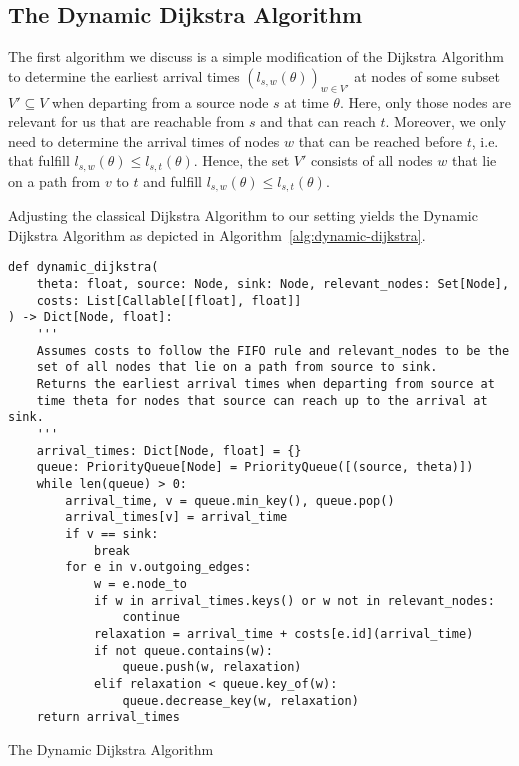\subsection{The Dynamic Dijkstra Algorithm}

The first algorithm we discuss is a simple modification of the Dijkstra Algorithm to determine the earliest arrival times $(l_{s,w}(\theta))_{w\in V'}$ at nodes of some subset $V'\subseteq V$ when departing from a source node $s$ at time $\theta$.
Here, only those nodes are relevant for us that are reachable from $s$ and that can reach $t$.
Moreover, we only need to determine the arrival times of nodes $w$ that can be reached before $t$, i.e. that fulfill $l_{s,w}(\theta) \leq l_{s,t}(\theta)$.
Hence, the set $V'$ consists of all nodes $w$ that lie on a path from $v$ to $t$ and fulfill $l_{s,w}(\theta) \leq l_{s,t}(\theta)$.

Adjusting the classical Dijkstra Algorithm to our setting yields the Dynamic Dijkstra Algorithm as depicted in Algorithm~\ref{alg:dynamic-dijkstra}.


\begin{algorithm}[h]
\begin{verbatim}
def dynamic_dijkstra(
    theta: float, source: Node, sink: Node, relevant_nodes: Set[Node],
    costs: List[Callable[[float], float]]
) -> Dict[Node, float]:
    '''
    Assumes costs to follow the FIFO rule and relevant_nodes to be the
    set of all nodes that lie on a path from source to sink.
    Returns the earliest arrival times when departing from source at
    time theta for nodes that source can reach up to the arrival at sink.
    '''
    arrival_times: Dict[Node, float] = {}
    queue: PriorityQueue[Node] = PriorityQueue([(source, theta)])
    while len(queue) > 0:
        arrival_time, v = queue.min_key(), queue.pop()
        arrival_times[v] = arrival_time
        if v == sink:
            break
        for e in v.outgoing_edges:
            w = e.node_to
            if w in arrival_times.keys() or w not in relevant_nodes:
                continue
            relaxation = arrival_time + costs[e.id](arrival_time)
            if not queue.contains(w):
                queue.push(w, relaxation)
            elif relaxation < queue.key_of(w):
                queue.decrease_key(w, relaxation)
    return arrival_times
\end{verbatim}
\caption{The Dynamic Dijkstra Algorithm}
\label{alg:dynamic-dijkstra}
\end{algorithm}

